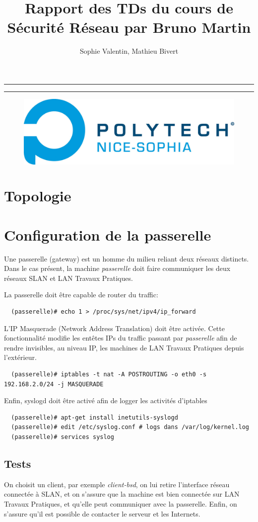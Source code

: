 \documentclass[a4paper]{article}
\title{Rapport des TDs du cours de Sécurité Réseau par Bruno Martin}
\author{Sophie Valentin, Mathieu Bivert}
\makeatletter
\def\maketitle{
	\null
	\thispagestyle{empty}
	\vskip 1cm
	\begin{center}
		\normalfont\large\huge\@author
	\end{center}
	\vfil
	\vfil
	\vfil
	\vfil
	\vfil
	\vfil
	\vfil
	\vfil
	\vfil
	\hrule height 2pt
	\par
	\begin{center}
				\huge \strut \@title \par
				\@date
	\end{center}
	\hrule height 2pt
	\par
	\vfil
	\vfil
	\vfil
	\vfil
	\vfil
	\vfil
	\vfil
	\vfil
	\vfil
	\vfil
	\vfil
	\vfil
	\vfil
	\vfil
	\vfil
	\vfil
	\vfil
	\vfil
	\vfil
	\vfil
	\vfil
	\vfil
	\vfil
	\vfil
	\vfil
	\null
	\begin{figure}[!ht]
		\centering
		\includegraphics[scale=.5]{polytech.png}
	\end{figure}
	\vfil
	\cleardoublepage
}
\makeatother
\begin{document}
\maketitle

\newpage
\tableofcontents

\newpage

\section{Topologie}
\section{Configuration de la passerelle}
Une passerelle (gateway) est un homme du milieu reliant
deux réseaux distincts. Dans le cas présent, la machine \textit{passerelle}
doit faire communiquer les deux réseaux SLAN et LAN Travaux Pratiques.

La passerelle doit être capable de router du traffic:
\begin{verbatim}
  (passerelle)# echo 1 > /proc/sys/net/ipv4/ip_forward
\end{verbatim}

L'IP Masquerade (Network Address Translation) doit être
activée. Cette fonctionnalité modifie les entêtes IPs du traffic
passant par \textit{passerelle} afin de rendre invisibles, au niveau IP,
les machines de LAN Travaux Pratiques depuis l'extérieur.

\begin{verbatim}
  (passerelle)# iptables -t nat -A POSTROUTING -o eth0 -s 192.168.2.0/24 -j MASQUERADE
\end{verbatim}

Enfin, syslogd doit être activé afin de logger les activités d'iptables

\begin{verbatim}
  (passerelle)# apt-get install inetutils-syslogd
  (passerelle)# edit /etc/syslog.conf # logs dans /var/log/kernel.log
  (passerelle)# services syslog
\end{verbatim}

\subsection{Tests}
On choisit un client, par exemple \textit{client-bsd}, on lui
retire l'interface réseau connectée à SLAN, et on s'assure que
la machine est bien connectée sur LAN Travaux Pratiques, et
qu'elle peut communiquer avec la passerelle. Enfin, on s'assure
qu'il est possible de contacter le serveur et les Internets.
\end{document}
